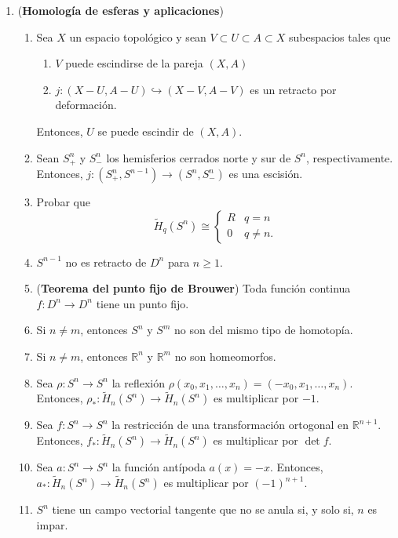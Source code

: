 \documentclass[11pt,a4paper]{article}
\theoremstyle{plain}
\theoremstyle{definition}
\theoremstyle{remark}
\newcommand{\RR}{\mathbb R}
\begin{document}
\begin{enumerate}[label=\arabic*.,leftmargin=*]
\item (\textbf{Homología de esferas y aplicaciones})
\begin{enumerate}[label=\alph*)]
\item Sea $X$ un espacio topológico y sean $V\subset U\subset A\subset X$
subespacios tales que
\begin{enumerate}[label=\arabic*)]
\item $V$ puede escindirse de la pareja $(X,A)$
\item $j:(X-U,A-U)\hookrightarrow(X-V,A-V)$ es un retracto por deformación.
\end{enumerate}
Entonces, $U$ se puede escindir de $(X,A)$.
\item Sean $S^n_+$ y $S^n_-$ los hemisferios cerrados norte y sur de $S^n$,
respectivamente. Entonces, $j:(S^n_+,S^{n-1})\to(S^n,S^n_-)$ es una
escisión.
\item Probar que
\[
\tilde H_q(S^n)\cong\begin{cases}R & q=n\\0 & q\ne n.\end{cases}
\]
\item $S^{n-1}$ no es retracto de $D^n$ para $n\ge1$.
\item (\textbf{Teorema del punto fijo de Brouwer}) Toda función continua
$f:D^n\to D^n$ tiene un punto fijo.
\item Si $n\ne m$, entonces $S^n$ y $S^m$ no son del mismo tipo de
homotopía.
\item Si $n\ne m$, entonces $\RR^n$ y $\RR^m$ no son homeomorfos.
\item Sea $\rho:S^n\to S^n$ la reflexión $\rho(x_0,x_1,\dots,x_n)=(-x_0,x_1,\dots,x_n)$.
Entonces, $\rho_*:\tilde H_n(S^n)\to\tilde H_n(S^n)$ es multiplicar por
$-1$.
\item Sea $f:S^n\to S^n$ la restricción de una transformación ortogonal en
$\RR^{n+1}$. Entonces, $f_*:\tilde H_n(S^n)\to\tilde H_n(S^n)$ es
multiplicar por $\det f$.
\item Sea $a:S^n\to S^n$ la función antípoda $a(x)=-x$. Entonces,
$a_*:\tilde H_n(S^n)\to\tilde H_n(S^n)$ es multiplicar por $(-1)^{n+1}$.
\item $S^n$ tiene un campo vectorial tangente que no se anula si, y solo
si, $n$ es impar.
\end{enumerate}


\end{enumerate}
\end{document}
